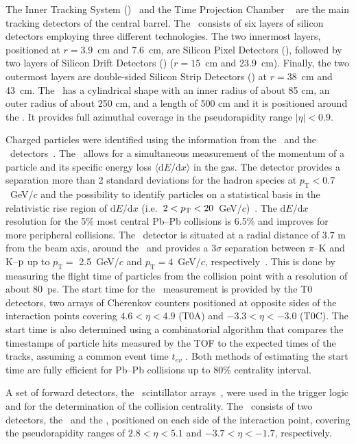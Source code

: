 \documentclass[ALICE,manyauthors]{cernphprep}
\begin{document}
The Inner Tracking System (\ITS)~\cite{Aamodt:2008zz} and the Time Projection Chamber \TPC~\cite{Alme:2010ke} are the main tracking detectors of the central barrel. The \ITS~consists of six layers of silicon detectors employing three different technologies. The two innermost layers, positioned at $r = 3.9$~cm and 7.6~cm,  are Silicon Pixel Detectors (\SPD), followed by two layers of Silicon Drift Detectors (\SDD) ($r = 15$~cm and 23.9~cm). Finally, the two outermost layers are double-sided Silicon Strip Detectors (\SSD) at $r = 38$~cm and 43~cm. The \TPC~has a cylindrical shape with an inner radius of about 85 cm, an outer radius of about 250 cm, and a length of 500 cm and it is positioned around the \ITS. It provides full azimuthal coverage in the pseudorapidity range $|\eta| < 0.9$. 

Charged particles were identified using the information from the \TPC~and the \TOF~detectors~\cite{Aamodt:2008zz}. The \TPC~allows for a simultaneous measurement of the momentum of a particle and its specific energy loss $\langle \mathrm{d}E/\mathrm{d}x \rangle$ in the gas. The detector provides a separation more than 2 standard deviations for the hadron species at $p_{\mathrm{T}} < 0.7$~GeV/$c$ and the possibility to identify particles on a statistical basis in the relativistic rise region of $\mathrm{d}E/\mathrm{d}x$ (i.e.~$2 < p_{\rm{T}} < 20$~GeV/$c$)~\cite{Abelev:2014ffa}. The $\mathrm{d}E/\mathrm{d}x$ resolution for the 5$\%$ most central Pb--Pb collisions is 6.5$\%$ and improves for more peripheral collisions. The \TOF~detector is situated at a radial distance of 3.7 m from the beam axis, around the \TPC~and provides a $3\sigma$ separation between $\pi$--K and K--$\rm{p}$ up to $p_{\mathrm{T}} = $ 2.5~GeV/$c$ and $p_{\mathrm{T}} = 4$~GeV/$c$, respectively~\cite{Abelev:2014ffa}. This is done by measuring the flight time of particles from the collision point with a resolution of about $80$~ps. The start time for the \TOF~measurement is provided by the T0 detectors, two arrays of Cherenkov counters positioned at opposite sides of the interaction points covering $4.6 < \eta < 4.9$ (T0A) and $-3.3 < \eta < -3.0$ (T0C). The start time is also determined using a combinatorial algorithm that compares the timestamps of particle hits measured by the TOF to the expected times of the tracks, assuming a common event time $t_{ev}$ \cite{Abelev:2014ffa}. Both methods of estimating the start time are fully efficient for Pb--Pb collisions up to 80\% centrality interval.

A set of forward detectors, the \VZERO~scintillator arrays~\cite{Abbas:2013taa}, were used in the trigger logic and for the determination of the collision centrality. The \VZERO~consists of two detectors, the \VZEROA~and the \VZEROC, positioned on each side of the interaction point, covering the pseudorapidity ranges of $2.8 < \eta < 5.1$ and $-3.7 < \eta < -1.7$, respectively. 
\end{document}
